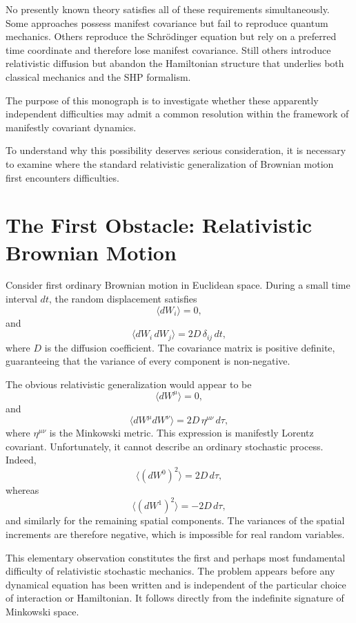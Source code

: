 No presently known theory satisfies all of these requirements simultaneously.
Some approaches possess manifest covariance but fail to reproduce quantum
mechanics. Others reproduce the Schrödinger equation but rely on a preferred
time coordinate and therefore lose manifest covariance. Still others introduce
relativistic diffusion but abandon the Hamiltonian structure that underlies
both classical mechanics and the SHP formalism.

The purpose of this monograph is to investigate whether these apparently
independent difficulties may admit a common resolution within the framework of
manifestly covariant dynamics.

To understand why this possibility deserves serious consideration, it is
necessary to examine where the standard relativistic generalization of
Brownian motion first encounters difficulties.
\section{The First Obstacle: Relativistic Brownian Motion}

Consider first ordinary Brownian motion in Euclidean space. During a small
time interval $dt$, the random displacement satisfies
\[\langle dW_i \rangle =0,\]
and
\[\langle dW_i\,dW_j\rangle=2D\,\delta_{ij}\,dt,\]
where $D$ is the diffusion coefficient.
The covariance matrix is positive definite, guaranteeing that the variance of
every component is non-negative.

The obvious relativistic generalization would appear to be
\[\langle dW^\mu\rangle =0,\]
and
\[\langle dW^\mu dW^\nu\rangle=2D\,\eta^{\mu\nu}\,d\tau,\]
where $\eta^{\mu\nu}$ is the Minkowski metric.
This expression is manifestly Lorentz covariant. Unfortunately, it cannot
describe an ordinary stochastic process.
Indeed,
\[\langle (dW^0)^2\rangle=2D\,d\tau,\]
whereas
\[\langle (dW^1)^2\rangle=-2D\,d\tau,\]
and similarly for the remaining spatial components. The variances of the
spatial increments are therefore negative, which is impossible for real random
variables.

This elementary observation constitutes the first and perhaps most fundamental
difficulty of relativistic stochastic mechanics. The problem appears before
any dynamical equation has been written and is independent of the particular
choice of interaction or Hamiltonian. It follows directly from the indefinite
signature of Minkowski space.

